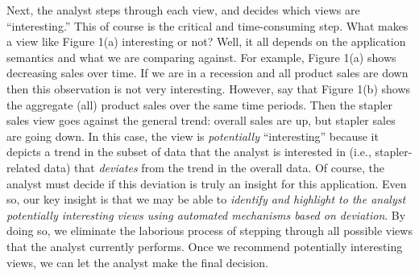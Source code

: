  Next, the analyst steps 
through each view, and decides which views are ``interesting.''
This of course is the critical and time-consu\-ming step.
What makes a view like Figure 1(a) interesting or not?
Well, it all depends on the application semantics
and what we are comparing against.
For example, Figure 1(a) shows decreasing sales over time.
If we are in a recession and all product sales are down then this observation
is not very interesting. However, say that Figure 1(b) shows
the aggregate (all) product sales over the same time periods.
Then the stapler sales view goes against the general trend: 
overall sales are up, but stapler sales are going down.
In this case, the view is {\em potentially} ``interesting''
because it depicts a trend in the subset of data
that the analyst is interested in (i.e., stapler-related data)
that {\em deviates} from the trend in the overall data.
Of course, the analyst must decide if this deviation 
is truly an insight for this application.
Even so, our key insight is that we may be able to 
{\em identify and highlight to the analyst potentially interesting views 
using automated mechanisms based on deviation}.
By doing so, we eliminate the laborious process
of stepping through all possible views that the analyst currently 
performs.
Once we recommend potentially interesting views, we can let the analyst
make the final decision.


\pgfplotsset{ticks=none}

